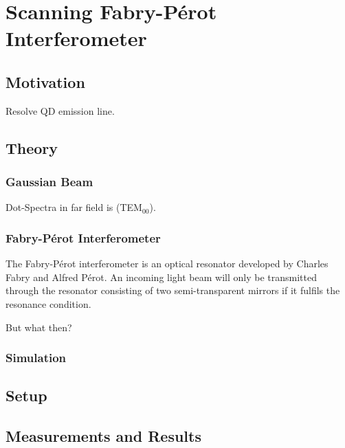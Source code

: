 \chapter{Scanning Fabry-Pérot Interferometer}

\section{Motivation}

Resolve QD emission line.

\section{Theory}

\subsection{Gaussian Beam}

Dot-Spectra in far field is (TEM$_{00}$).

\subsection{Fabry-Pérot Interferometer}

The Fabry-Pérot interferometer is an optical resonator developed by Charles Fabry and Alfred Pérot.
An incoming light beam will only be transmitted through the resonator consisting of two semi-transparent mirrors if it fulfils the resonance condition.

But what then?

\subsection{Simulation}




\section{Setup}

\section{Measurements and Results}